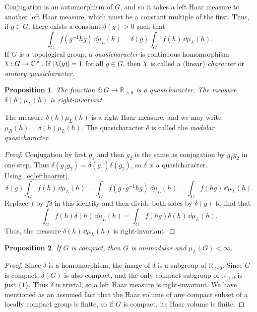 \documentclass[12pt,reqno]{book}%
\newtheorem{proposition}{Proposition}[chapter]
\theoremstyle{definition}
\theoremstyle{remark}
\theoremstyle{theorem}
\theoremstyle{remark}
\newcommand{\mychi}{\raisebox{2pt}{$\chi$}}
\renewcommand{\d}{\dd}
\begin{document}
Conjugation is an automorphism of $G$, and so it takes a left Haar measure to another left Haar measure, which must be a constant multiple of the first.
Thus, if $g \in G$, there exists a constant $\delta(g) > 0$ such that
\[
    \int_{G} f(g^{-1}hg) \, \d\mu_L(h) = \delta(g) \int_{G} f(h) \, \d\mu_L(h).
\]
If $G$ is a topological group, a \emph{quasicharacter} is continuous homomorphism $\mychi : G \to \mathbb{C}^{\times}$.
If $|\mychi(g)| = 1$ for all $g \in G$, then $\mychi$ is called a (linear) \emph{character} or \emph{unitary quasicharacter}.

\begin{proposition}\label{}%
    The function $\delta : G \to \mathbb{R}_{>0}$ is a quasicharacter.
    The measure $\delta(h) \mu_L(h)$ is right-invariant.
\end{proposition}%

The measure $\delta(h) \mu_L(h)$ is a right Haar measure, and we may write $\mu_R(h) = \delta(h) \mu_L(h)$.
The quasicharacter $\delta$ is called the \emph{modular quasicharacter}.
\begin{proof}%
    Conjugation by first $g_1$ and then $g_2$ is the same as conjugation by $g_1g_2$ in one step.
    Thus $\delta(g_1g_2) = \delta(g_1) \delta(g_2)$, so $\delta$ is a quasicharacter.
    Using~\eqref{eqlefthaarint},
    \[
        \delta(g) \int_{G} f(h) \, \d\mu_L(h) = \int_{G} f(g \cdot g^{-1}hg) \, \d\mu_L(h) = \int_{G} f(hg) \, \d\mu_L(h).
    \]
    Replace $f$ by $f\delta$ in this identity and then divide both sides by $\delta(g)$ to find that
    \[
        \int_{G} f(h) \delta(h) \, \d\mu_L(h) = \int_{G} f(hg) \delta(h) \, \d\mu_L(h).
    \]
    Thus, the measure $\delta(h) \, \d\mu_L(h)$ is right-invariant.
\end{proof}%

\begin{proposition}\label{}%
    If $G$ is compact, then $G$ is unimodular and $\mu_L(G) < \infty$.
\end{proposition}%
\begin{proof}%
    Since $\delta$ is a homomorphism, the image of $\delta$ is a subgroup of $\mathbb{R}_{>0}$.
    Since $G$ is compact, $\delta(G)$ is also compact, and the only compact subgroup of $\mathbb{R}_{>0}$ is just $\{1\}$.
    Thus $\delta$ is trivial, so a left Haar measure is right-invariant.
    We have mentioned as an assumed fact that the Haar volume of any compact subset of a locally compact group is finite, so if $G$ is compact, its Haar volume is finite.
\end{proof}%
\end{document}
